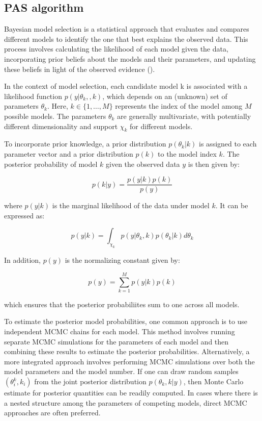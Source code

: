 \documentclass{report}
\begin{document}
\subsection{PAS algorithm}

Bayesian model selection is a statistical approach that evaluates and compares different models to identify the one that best explains the observed data. This process involves calculating the likelihood of each model given the data, incorporating prior beliefs about the models and their parameters, and updating these beliefs in light of the observed evidence (\citet{godsill2001relationship}). 

In the context of model selection, each candidate model 
k is associated with a likelihood function $p(y | \theta_k,, k)$, which depends on an (unknown) set of parameters $\theta_k$. Here, $k \in \{1,\ldots, M\}$ represents the index of the model among $M$ possible models. The parameters $\theta_k$ are generally multivariate, with potentially different dimensionality and support $\chi_k$ for different models. \hfill \break 

To incorporate prior knowledge, a prior distribution $p(\theta_k | k)$ is assigned to each parameter vector and a prior distribution $p(k)$ to the model index $k$. The posterior probability of model $k$ given the observed data $y$ is then given by:

\begin{equation} \label{pas-post}
	p(k | y) = \frac{p(y|k)p(k)}{p(y)}
\end{equation}

where $p(y |k)$ is the marginal likelihood of the data under model $k$. It can be expressed as:

\begin{equation} 
	p(y|k)=\int_{\chi_k} p(y|\theta_k,k)p(\theta_k|k) d\theta_k
\end{equation}

In addition, $p(y)$ is the normalizing constant given by:

\begin{equation}
	p(y)=\sum^M_{k=1}p(y|k)p(k)
\end{equation}

which ensures that the posterior probabiliites sum to one across all models. 

To estimate the posterior model probabilities, one common approach is to use independent MCMC chains for each model. This method involves running separate MCMC simulations for the parameters of each model and then combining these results to estimate the posterior probabilities. 
Alternatively, a more integrated approach involves performing MCMC simulations over both the model parameters and the model number. If one can draw random samples $(\theta_i^k,k_i)$ from the joint posterior distribution $p(\theta_k,k|y)$, then Monte Carlo estimate for posterior quantities can be readily computed. 
In cases where there is a nested structure among the parameters of competing models, direct MCMC approaches are often preferred.
\end{document}
